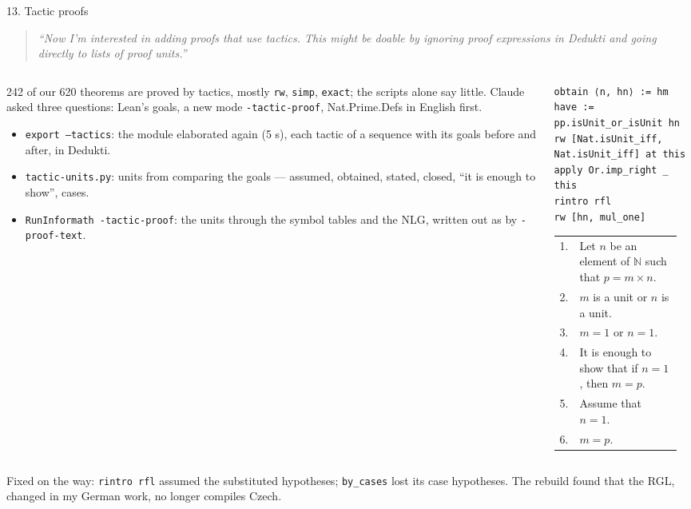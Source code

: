\documentclass[10pt,aspectratio=169]{beamer}
\newcommand{\bad}[1]{\textcolor{warn}{#1}}
\newcommand{\ok}[1]{\textcolor{good}{#1}}
\newcommand{\prompt}[1]{\begin{quote}\small\itshape ``#1''\end{quote}}
\begin{document}
\begin{frame}[fragile]{13. Tactic proofs}
  \footnotesize
  \prompt{Now I'm interested in adding proofs that use tactics. This might be doable by
  ignoring proof expressions in Dedukti and going directly to lists of proof units.}
  \begin{columns}[T]
    \begin{column}{0.5\textwidth}
      242 of our 620 theorems are proved by tactics, mostly \texttt{rw}, \texttt{simp},
      \texttt{exact}; the scripts alone say little. Claude asked three questions:
      \ok{Lean's goals}, \ok{a new mode \texttt{-tactic-proof}}, \ok{Nat.Prime.Defs in
      English first}.
      \begin{itemize}
        \item \texttt{export --tactics}: the module elaborated again (5 s), each tactic
              of a sequence with its goals before and after, in Dedukti.
        \item \texttt{tactic-units.py}: units from comparing the goals --- assumed,
              obtained, stated, closed, ``it is enough to show'', cases.
        \item \texttt{RunInformath -tactic-proof}: the units through the symbol tables and
              the NLG, written out as by \texttt{-proof-text}.
      \end{itemize}
    \end{column}
    \begin{column}{0.48\textwidth}
\begin{lstlisting}
obtain ⟨n, hn⟩ := hm
have := pp.isUnit_or_isUnit hn
rw [Nat.isUnit_iff, Nat.isUnit_iff] at this
apply Or.imp_right _ this
rintro rfl
rw [hn, mul_one]
\end{lstlisting}
      \scriptsize
      \begin{tabular}{@{}r>{\raggedright\arraybackslash}p{0.88\linewidth}@{}}
        1. & Let $n$ be an element of $\mathbb{N}$ such that $p = m \times n$. \\
        2. & $m$ is a unit or $n$ is a unit. \\
        3. & $m = 1$ or $n = 1$. \\
        4. & It is enough to show that if $n = 1$, then $m = p$. \\
        5. & Assume that $n = 1$. \\
        6. & $m = p$. \\
      \end{tabular}
    \end{column}
  \end{columns}
  Fixed on the way: \texttt{rintro rfl} assumed the \bad{substituted} hypotheses;
  \texttt{by\_cases} lost its case hypotheses. The rebuild found that the RGL, changed in my
  German work, no longer compiles \bad{Czech}.
\end{frame}
\end{document}
